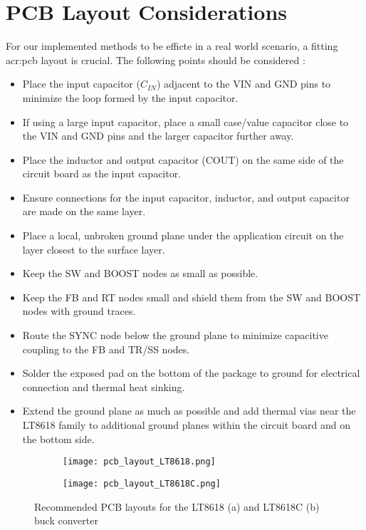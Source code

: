 \section{PCB Layout Considerations}
\label{section:pcb_layout_considerations}
For our implemented methods to be efficte in a real world scenario, a fitting \Gls{acr:pcb} layout is crucial. The following points should be considered \autocite{LT8618DatasheetProduct}:
\begin{itemize}
    \item Place the input capacitor ($C_{IN}$) adjacent to the VIN and GND pins to minimize the loop formed by the input capacitor.
    \item If using a large input capacitor, place a small case/value capacitor close to the VIN and GND pins and the larger capacitor further away.
    \item Place the inductor and output capacitor (COUT) on the same side of the circuit board as the input capacitor.
    \item Ensure connections for the input capacitor, inductor, and output capacitor are made on the same layer.
    \item Place a local, unbroken ground plane under the application circuit on the layer closest to the surface layer.
    \item Keep the SW and BOOST nodes as small as possible.
    \item Keep the FB and RT nodes small and shield them from the SW and BOOST nodes with ground traces.
    \item Route the SYNC node below the ground plane to minimize capacitive coupling to the FB and TR/SS nodes.
    \item Solder the exposed pad on the bottom of the package to ground for electrical connection and thermal heat sinking.
    \item Extend the ground plane as much as possible and add thermal vias near the LT8618 family to additional ground planes within the circuit board and on the bottom side.
\end{itemize}



\begin{figure}[htbp]
    \centering
    \begin{subfigure}[b]{0.45\textwidth}
        \centering
        \texttt{[image: pcb\_layout\_LT8618.png]}
        \label{fig:pcb_layout_LT8618}
    \end{subfigure}
    \hfill
    \begin{subfigure}[b]{0.45\textwidth}
        \centering
        \texttt{[image: pcb\_layout\_LT8618C.png]}
        \label{fig:pcb_layout_LT8618C}
    \end{subfigure}
    \caption{Recommended PCB layouts for the LT8618 (a) and LT8618C (b) buck converter \autocite{LT8618DatasheetProduct}}
\end{figure}
